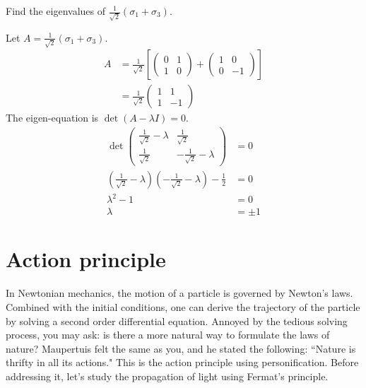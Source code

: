 \documentclass[12pt]{book} %
\numberwithin{equation}{chapter}
\def\l{\lambda}
\def\s{\sigma}
\begin{document}
\begin{problem}
Find the eigenvalues of $\frac{1}{\sqrt{2}}\left(\s_{1}+\s_{3}\right)$.
\end{problem}

\begin{solbox}
Let $A=\frac{1}{\sqrt{2}}\left(\s_{1}+\s_{3}\right)$.
\begin{align*}
A&=\frac{1}{\sqrt{2}}\left[
\begin{pmatrix}
0&1\\
1&0
\end{pmatrix}
+
\begin{pmatrix}
1&0\\
0&-1
\end{pmatrix}\right]\\
&=\frac{1}{\sqrt{2}}
\begin{pmatrix}
1&1\\
1&-1
\end{pmatrix}
\end{align*}
The eigen-equation is $\det(A-\l I)=0$.
\begin{align*}
\det
\begin{pmatrix}
\frac{1}{\sqrt{2}}-\l&\frac{1}{\sqrt{2}}\\
\frac{1}{\sqrt{2}}&-\frac{1}{\sqrt{2}}-\l
\end{pmatrix}
&=0\\
\left(\frac{1}{\sqrt{2}}-\l\right)\left(-\frac{1}{\sqrt{2}}-\l\right)-\frac{1}{2}&=0\\
\l^{2}-1&=0\\
\l&=\pm1
\end{align*}
\end{solbox}

\newpage
{} %
\chapter{Action principle}
In Newtonian mechanics, the motion of a particle is governed by Newton's laws. Combined with the initial conditions, one can derive the trajectory of the particle by solving a second order differential equation. Annoyed by the tedious solving process, you may ask: is there a more natural way to formulate the laws of nature?\bigskip\newline
Maupertuis felt the same as you, and he stated the following:\bigskip\newline
``Nature is thrifty in all its actions."\bigskip\newline
This is the action principle using personification. Before addressing it, let's study the propagation of light using Fermat's principle.
\end{document}
